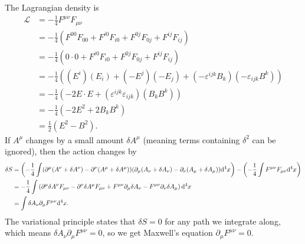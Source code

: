 \documentclass{article}
\begin{document}
\bigskip
\par
\begin{prob}
\end{prob}
The Lagrangian density is
\begin{align*}
    \mathcal{L} &= - \frac{1}{4} F^{\mu \nu} F_{\mu \nu} \\
                &= - \frac{1}{4} \left( F^{00}F_{00} + F^{i0}F_{i0} + F^{0j}F_{0j} + F^{ij}F_{ij} \right) \\
                &= - \frac{1}{4} \left( 0 \cdot 0 + F^{i0}F_{i0} + F^{0j}F_{0j} + F^{ij}F_{ij} \right)  \\
                &= - \frac{1}{4} \left( (E^i) (E_i) + (-E^j)(-E_j) + (-\varepsilon^{ijk}B_k) (-\varepsilon_{ijk}B^k) \right)  \\
                &= - \frac{1}{4} \left( -2 E \cdot E + (\varepsilon^{ijk} \varepsilon_{ijk})(B_k B^k) \right)  \\
                &= - \frac{1}{4} \left( -2 E^2 + 2 B_k B^k \right)  \\
                &= \frac{1}{2} \left( E^2 - B^2 \right).
\end{align*}
If $A^\mu$ changes by a small amount $\delta A^\mu$ (meaning terms containing $\delta^2$ can be ignored), then the action changes by
\begin{align*}
    \delta S &= \left( - \frac{1}{4} \int (\partial^\mu (A^\nu + \delta A^\nu) - \partial^\nu (A^\mu + \delta A^\mu)) (\partial_\mu (A_\nu + \delta A_\nu) - \partial_\nu (A_\mu + \delta A_\mu)) \mathrm{d}^4 x \right) - \left( - \frac{1}{4} \int F^{\mu \nu} F_{\mu \nu} \mathrm{d}^4 x \right) \\
             &= - \frac{1}{4} \int \left( \partial^\mu \delta A^\nu F_{\mu \nu} - \partial^\nu \delta A^\mu F_{\mu \nu} + F^{\mu \nu} \partial_\mu \delta A_\nu - F^{\mu \nu} \partial_\nu \delta A_\mu \right) \mathrm{d}^4 x \\
             &= \int \delta A_\nu \partial_\mu F^{\mu \nu} \mathrm{d}^4 x.
\end{align*}
The variational principle states that $\delta S = 0$ for any path we integrate along, which means $\delta A_\nu \partial_\mu F^{\mu \nu} = 0$, so we get Maxwell's equation $\partial_\mu F^{\mu \nu} = 0$.
\end{document}
